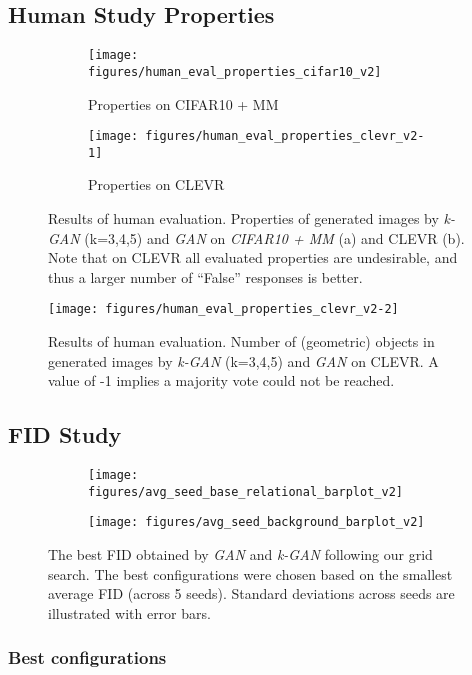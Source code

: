 \documentclass{article}
\begin{document}
\subsection{Human Study Properties}\begin{figure}[h]
\begin{subfigure}{.5\textwidth}
  \centering
  \texttt{[image: figures/human\_eval\_properties\_cifar10\_v2]}
  \caption{Properties on CIFAR10 + MM}
  \label{fig:human_eval_properties_cifar10}
\end{subfigure}%
\begin{subfigure}{0.5\textwidth}
  \centering
  \texttt{[image: figures/human\_eval\_properties\_clevr\_v2-1]}
  \caption{Properties on CLEVR}
  \label{fig:human_eval_properties_clevr}
\end{subfigure}
\caption{Results of human evaluation. Properties of generated images by \emph{k-GAN} (k=3,4,5) and \emph{GAN} on \emph{CIFAR10 + MM} (a) and CLEVR (b). Note that on CLEVR all evaluated properties are undesirable, and thus a larger number of ``False'' responses is better.}
\end{figure}\begin{figure}[h]
\centering
\texttt{[image: figures/human\_eval\_properties\_clevr\_v2-2]}
\caption{Results of human evaluation. Number of (geometric) objects in generated images by \emph{k-GAN} (k=3,4,5) and \emph{GAN} on CLEVR. A value of -1 implies a majority vote could not be reached.}
\label{fig:human_eval_properties_clevr_counts}
\end{figure}\newpage\subsection{FID Study}\begin{figure}[h]
\begin{subfigure}{.6\textwidth}
  \centering
  \texttt{[image: figures/avg\_seed\_base\_relational\_barplot\_v2]}
  \label{fig:fid_scores1}
\end{subfigure}%
\begin{subfigure}{.4\textwidth}
  \centering
  \texttt{[image: figures/avg\_seed\_background\_barplot\_v2]}
  \label{fig:fid_scores2}
\end{subfigure}
\caption{The best FID obtained by \emph{GAN} and \emph{k-GAN} following our grid search. The best configurations were chosen based on the smallest average FID (across 5 seeds). Standard deviations across seeds are illustrated with error bars.}
\label{fig:fid_scores}
\end{figure}\newpage\subsubsection{Best configurations}
\end{document}
